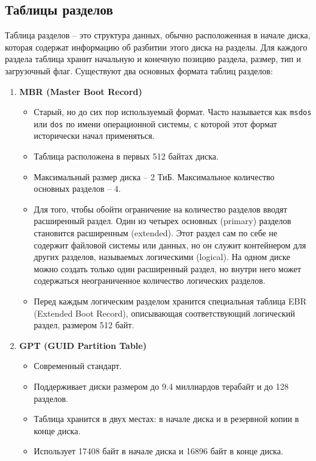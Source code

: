 \documentclass[10pt]{article}
\begin{document}
\subsection*{Таблицы разделов}
Таблица разделов -- это структура данных, обычно расположенная в начале диска, которая содержат информацию об разбитии этого диска на разделы. Для каждого раздела таблица хранит начальную и конечную позицию раздела, размер, тип и загрузочный флаг.
Существуют два основных формата таблиц разделов:
\begin{enumerate}
\item \textbf{MBR (Master Boot Record)}
\vspace{-2mm}
\begin{itemize}
\item Старый, но до сих пор используемый формат. Часто называется как \texttt{msdos} или \texttt{dos} по имени операционной системы, с которой этот формат исторически начал применяться.
\item Таблица расположена в первых 512 байтах диска. 
\item Максимальный размер диска -- 2 ТиБ. Максимальное количество основных разделов -- 4.
\item Для того, чтобы обойти ограничение на количество разделов вводят расширенный раздел. Один из четырех основных (primary) разделов становится расширенным (extended). Этот раздел сам по себе не содержит файловой системы или данных, но он служит контейнером для других разделов, называемых логическими (logical). На одном диске можно создать только один расширенный раздел, но внутри него может содержаться неограниченное количество логических разделов.
\item Перед каждым логическим разделом хранится специальная таблица EBR (Extended Boot Record), описывающая соответствующий логический раздел, размером 512 байт.

\end{itemize}

  
\item \textbf{GPT (GUID Partition Table)}
\begin{itemize}
\item Современный стандарт.
\item Поддерживает диски размером до 9.4 миллиардов терабайт и до 128 разделов.
\item Таблица хранится в двух местах: в начале диска и в резервной копии в конце диска.
\item Использует 17408 байт в начале диска и 16896 байт в конце диска.

\end{itemize}
\end{enumerate}
\end{document}

